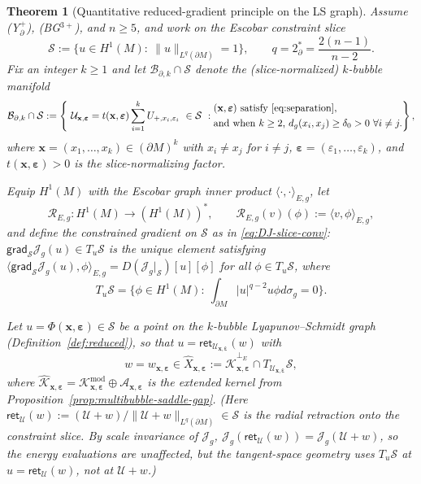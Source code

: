 \documentclass[11pt,reqno,a4paper]{amsart}
\numberwithin{equation}{section}
\theoremstyle{plain}
\newtheorem{theorem}{Theorem}[section]
\theoremstyle{remark}
\theoremstyle{plain}
\begin{document}
\begin{theorem}[Quantitative reduced-gradient principle on the LS graph]
\label{thm:reduced-gradient-k}
Assume \textup{(Y$^+_{\partial}$)}, \textup{(BG$^{3+}$)}, and $n\ge5$, and work on the Escobar constraint slice
\[
\mathcal S:=\Big\{u\in H^1(M):\ \|u\|_{L^q(\partial M)}=1\Big\},
\qquad q=2^*_{\partial}=\frac{2(n-1)}{n-2}.
\]
Fix an integer $k\ge1$ and let $\mathcal B_{\partial,k}\cap\mathcal S$ denote the \emph{(slice-normalized) $k$-bubble manifold}
\[
\mathcal B_{\partial,k}\cap\mathcal S
:=\left\{\ \mathcal U_{\mathbf x,\boldsymbol\varepsilon}
=t(\mathbf x,\boldsymbol\varepsilon)\sum_{i=1}^k U_{+,x_i,\varepsilon_i}\ \in\mathcal S
\ :\begin{aligned} &(\mathbf x,\boldsymbol\varepsilon)\ \text{satisfy \eqref{eq:separation}},\\ &\text{and when $k\ge2$,}
\ d_g(x_i,x_j)\ge\delta_0>0\ \forall i\ne j.\end{aligned} \right\},
\]
where $\mathbf x=(x_1,\dots,x_k)\in(\partial M)^k$ with $x_i\ne x_j$ for $i\ne j$, $\boldsymbol\varepsilon=(\varepsilon_1,\dots,\varepsilon_k)$,
and $t(\mathbf x,\boldsymbol\varepsilon)>0$ is the slice-normalizing factor.

Equip $H^1(M)$ with the Escobar graph inner product $\langle\cdot,\cdot\rangle_{E,g}$, let
\[
\mathcal R_{E,g}:H^1(M)\to(H^1(M))^\ast,\qquad
\mathcal R_{E,g}(v)(\phi):=\langle v,\phi\rangle_{E,g},
\]
and define the constrained gradient on $\mathcal S$ as in \eqref{eq:DJ-slice-conv}:
$\mathsf{grad}_{\mathcal S}\mathcal J_g(u)\in T_u\mathcal S$ is the unique element satisfying
$\langle \mathsf{grad}_{\mathcal S}\mathcal J_g(u),\phi\rangle_{E,g}=D(\mathcal J_g|_{\mathcal S})[u][\phi]$
for all $\phi\in T_u\mathcal S$, where
\[
T_u\mathcal S=\Big\{\phi\in H^1(M):\ \int_{\partial M}|u|^{q-2}u\phi d\sigma_g=0\Big\}.
\]

Let $u=\Phi(\mathbf x,\boldsymbol\varepsilon)\in\mathcal S$ be a point on the
$k$-bubble Lyapunov--Schmidt graph (Definition~\ref{def:reduced}),
so that
$u=\mathsf{ret}_{\mathcal U_{\mathbf x,\boldsymbol\varepsilon}}(w)$ with
\begin{equation}\label{eq:k-modulation-decomp}
w=w_{\mathbf x,\boldsymbol\varepsilon}\in\widehat X_{\mathbf x,\boldsymbol\varepsilon}
:=\widehat{\mathcal K}_{\mathbf x,\boldsymbol\varepsilon}^{\perp_E}\cap T_{\mathcal U_{\mathbf x,\boldsymbol\varepsilon}}\mathcal S,
\end{equation}
where $\widehat{\mathcal K}_{\mathbf x,\boldsymbol\varepsilon}=\mathcal K^{\mathrm{mod}}_{\mathbf x,\boldsymbol\varepsilon}\oplus \mathcal A_{\mathbf x,\boldsymbol\varepsilon}$ is the extended kernel
from Proposition~\ref{prop:multibubble-saddle-gap}.
(Here $\mathsf{ret}_{\mathcal U}(w):=(\mathcal U+w)/\|\mathcal U+w\|_{L^q(\partial M)}\in\mathcal S$
is the radial retraction onto the constraint slice.
By scale invariance of $\mathcal J_g$,
$\mathcal J_g(\mathsf{ret}_{\mathcal U}(w))=\mathcal J_g(\mathcal U+w)$,
so the energy evaluations are unaffected, but the tangent-space geometry
uses $T_u\mathcal S$ at $u=\mathsf{ret}_{\mathcal U}(w)$, not at $\mathcal U+w$.)


\end{theorem}
\end{document}
